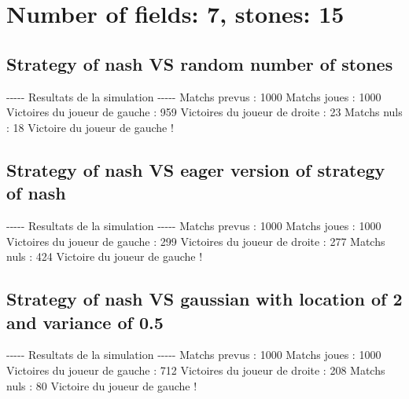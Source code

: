 \documentclass{article}%
\begin{document}
%
\normalsize%
\section{Number of fields: 7, stones: 15}%
\label{sec:Number of fields 7, stones 15}%
\subsection{Strategy of nash VS random number of stones}%
\label{subsec:Strategy of nash VS random number of stones}%
{-}{-}{-}{-}{-} Resultats de la simulation {-}{-}{-}{-}{-}\newline%
		\newline%
Matchs prevus : 1000\newline%
Matchs joues : 1000\newline%
\newline%
Victoires du joueur de gauche : 959\newline%
Victoires du joueur de droite : 23\newline%
Matchs nuls : 18\newline%
\newline%
Victoire du joueur de gauche !

%
\subsection{Strategy of nash VS eager version of strategy of nash}%
\label{subsec:Strategy of nash VS eager version of strategy of nash}%
{-}{-}{-}{-}{-} Resultats de la simulation {-}{-}{-}{-}{-}\newline%
		\newline%
Matchs prevus : 1000\newline%
Matchs joues : 1000\newline%
\newline%
Victoires du joueur de gauche : 299\newline%
Victoires du joueur de droite : 277\newline%
Matchs nuls : 424\newline%
\newline%
Victoire du joueur de gauche !

%
\subsection{Strategy of nash VS gaussian with location of 2 and variance of 0.5}%
\label{subsec:Strategy of nash VS gaussian with location of 2 and variance of 0.5}%
{-}{-}{-}{-}{-} Resultats de la simulation {-}{-}{-}{-}{-}\newline%
		\newline%
Matchs prevus : 1000\newline%
Matchs joues : 1000\newline%
\newline%
Victoires du joueur de gauche : 712\newline%
Victoires du joueur de droite : 208\newline%
Matchs nuls : 80\newline%
\newline%
Victoire du joueur de gauche !
\end{document}
